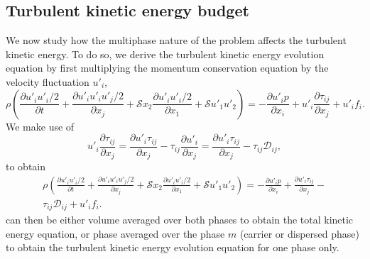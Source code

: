 \subsection{Turbulent kinetic energy budget}
We now study how the multiphase nature of the problem affects the turbulent kinetic energy. To do so, we derive the turbulent kinetic energy evolution equation by first multiplying the momentum conservation equation  by the velocity fluctuation $u'_i$,
\begin{equation}
\rho \left( \frac{\partial u'_i u'_i/2}{\partial t} + \frac{\partial u'_i u'_i u'_j/2}{\partial x_j} + \mathcal{S} x_2 \frac{\partial u'_i u'_i/2}{\partial x_1} + \mathcal{S} u'_1 u'_2 \right)  = - \frac{\partial u'_i p}{\partial x_i} + u'_i \frac{\partial  \tau_{ij}}{\partial x_j} + u'_i f_i.
\end{equation}
We make use of 
\begin{equation}
u'_i \frac{\partial \tau_{ij}}{\partial x_j} = \frac{\partial u'_i \tau_{ij}}{ \partial x_j} - \tau_{ij} \frac{\partial u'_i }{ \partial x_j} = \frac{\partial u'_i \tau_{ij}}{ \partial x_j} - \tau_{ij} \mathcal{D}_{ij},
\end{equation}
to obtain
\begin{equation}
\label{eq:tke0}
  \begin{aligned}
\rho \left( \frac{\partial u'_i u'_i/2}{\partial t} + \frac{\partial u'_i u'_i u'_j/2}{\partial x_j} + \mathcal{S} x_2 \frac{\partial u'_i u'_i/2}{\partial x_1} + \mathcal{S} u'_1 u'_2 \right)  = - \frac{\partial u'_i p}{\partial x_i} + \frac{\partial u'_i \tau_{ij}}{ \partial x_j} -\\ \tau_{ij} \mathcal{D}_{ij} + u'_i f_i.
  \end{aligned}
\end{equation}
 can then be either volume averaged over both phases to obtain the total kinetic energy equation, or phase averaged over the phase $m$ (\eg carrier or dispersed phase) to obtain the turbulent kinetic energy evolution equation for one phase only. 

